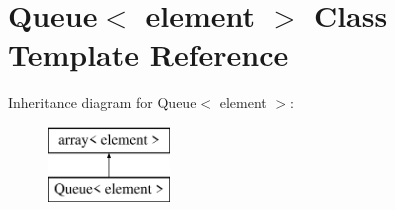 \hypertarget{class_queue}{\section{Queue$<$ element $>$ Class Template Reference}
\label{class_queue}
}
Inheritance diagram for Queue$<$ element $>$\+:\begin{figure}[H]
\begin{center}
\leavevmode
\includegraphics[height=2.000000cm]{class_queue}
\end{center}
\end{figure}
